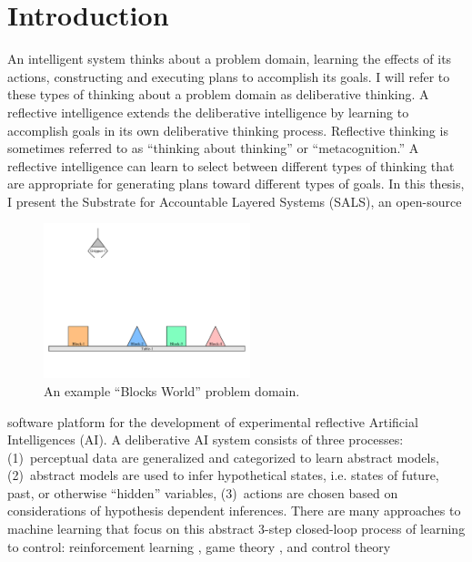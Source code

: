 \chapter{Introduction}
\label{chapter:introduction}

An intelligent system thinks about a problem domain, learning the
effects of its actions, constructing and executing plans to accomplish
its goals.  I will refer to these types of thinking about a problem
domain as deliberative thinking.  A reflective intelligence extends
the deliberative intelligence by learning to accomplish goals in its
own deliberative thinking process.  Reflective thinking is sometimes
referred to as ``thinking about thinking'' or ``metacognition.''  A
reflective intelligence can learn to select between different types of
thinking that are appropriate for generating plans toward different
types of goals.  In this thesis, I present the Substrate for
Accountable Layered Systems (SALS), an open-source
\begin{figure}
  \includegraphics[width=6cm]{gfx/blocks_world_large-01}
  \caption[An example ``Blocks World'' problem domain.]{An example
    ``Blocks World'' problem domain.}
  \label{figure:introduction_example_problem_domain}
\end{figure}
software platform for the development of experimental reflective
Artificial Intelligences (AI).  A deliberative AI system consists of
three processes: {\mbox{(1)~perceptual}} data are generalized and
categorized to learn abstract models, {\mbox{(2)~abstract}} models are
used to infer hypothetical states, i.e. states of future, past, or
otherwise ``hidden'' variables, {\mbox{(3)~actions}} are chosen based
on considerations of hypothesis dependent inferences.  There are many
approaches to machine learning that focus on this abstract 3-step
closed-loop process of learning to control: reinforcement learning
\cite[]{kaelbling:1996,dvzeroski:2001}, game theory
\cite[]{bowling:2000,rapoport:2001}, and control theory
